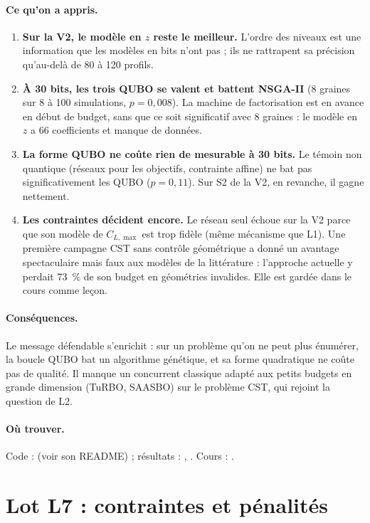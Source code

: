 \documentclass[11pt,a4paper]{report}
\begin{document}
\paragraph{Ce qu'on a appris.}
\begin{enumerate}
\item \textbf{Sur la V2, le modèle en $z$ reste le meilleur.} L'ordre des niveaux est une information que les modèles en bits n'ont pas ; ils ne rattrapent sa précision qu'au-delà de 80 à 120 profils.
\item \textbf{À 30 bits, les trois QUBO se valent et battent NSGA-II} (8 graines sur 8 à 100 simulations, $p=0{,}008$). La machine de factorisation est en avance en début de budget, sans que ce soit significatif avec 8 graines : le modèle en $z$ a 66 coefficients et manque de données.
\item \textbf{La forme QUBO ne coûte rien de mesurable à 30 bits.} Le témoin non quantique (réseaux pour les objectifs, contrainte affine) ne bat pas significativement les QUBO ($p=0{,}11$). Sur S2 de la V2, en revanche, il gagne nettement.
\item \textbf{Les contraintes décident encore.} Le réseau seul échoue sur la V2 parce que son modèle de $C_{L,\max}$ est trop fidèle (même mécanisme que L1). Une première campagne CST sans contrôle géométrique a donné un avantage spectaculaire mais faux aux modèles de la littérature : l'approche actuelle y perdait 73~\% de son budget en géométries invalides. Elle est gardée dans le cours comme leçon.
\end{enumerate}

\paragraph{Conséquences.} Le message défendable s'enrichit : sur un problème qu'on ne peut plus énumérer, la boucle QUBO bat un algorithme génétique, et sa forme quadratique ne coûte pas de qualité. Il manque un concurrent classique adapté aux petits budgets en grande dimension (TuRBO, SAASBO) sur le problème CST, qui rejoint la question de L2.

\paragraph{Où trouver.} Code :  (voir son README) ; résultats : , . Cours : .

\section{Lot L7 : contraintes et pénalités}\label{sec:v3-l7}
\end{document}
